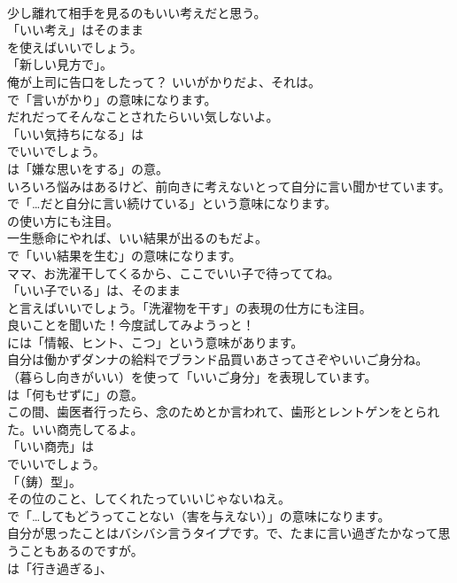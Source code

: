 \documentclass[8pt]{extreport}
\begin{document}
\begin{CJK}{UTF8}{min}
\\	少し離れて相手を見るのもいい考えだと思う。 
\\	「いい考え」はそのまま
\\	を使えばいいでしょう。
\\	「新しい見方で」。	
\\	俺が上司に告口をしたって？ いいがかりだよ、それは。 
\\	で「言いがかり」の意味になります。	
\\	だれだってそんなことされたらいい気しないよ。 
\\	「いい気持ちになる」は 
\\	でいいでしょう。
\\	は「嫌な思いをする」の意。	
\\	いろいろ悩みはあるけど、前向きに考えないとって自分に言い聞かせています。 
\\	で「…だと自分に言い続けている」という意味になります。
\\	の使い方にも注目。	
\\	一生懸命にやれば、いい結果が出るのもだよ。 
\\	で「いい結果を生む」の意味になります。	
\\	ママ、お洗濯干してくるから、ここでいい子で待っててね。 
\\	「いい子でいる」は、そのまま
\\	と言えばいいでしょう。「洗濯物を干す」の表現の仕方にも注目。	
\\	良いことを聞いた！今度試してみようっと！ 
\\	には「情報、ヒント、こつ」という意味があります。	
\\	自分は働かずダンナの給料でブランド品買いあさってさぞやいいご身分ね。 
\\	（暮らし向きがいい）を使って「いいご身分」を表現しています。
\\	は「何もせずに」の意。	
\\	この間、歯医者行ったら、念のためとか言われて、歯形とレントゲンをとられた。いい商売してるよ。 
\\	「いい商売」は
\\	でいいでしょう。
\\	「（鋳）型」。	
\\	その位のこと、してくれたっていいじゃないねえ。 
\\	で「…してもどうってことない（害を与えない）」の意味になります。	
\\	自分が思ったことはバシバシ言うタイプです。で、たまに言い過ぎたかなって思うこともあるのですが。 
\\	は「行き過ぎる」、

\end{CJK}
\end{document}
